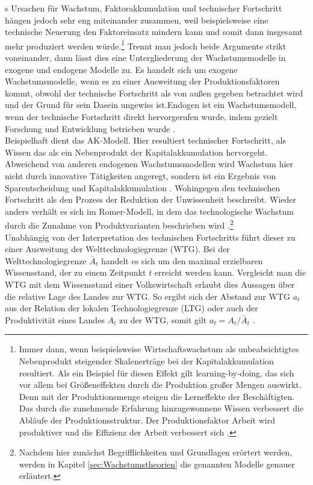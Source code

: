 \citeauthor{Gandolfo.1998}s \citeyear{Gandolfo.1998} Ursachen für Wachstum, Faktorakkumulation und technischer Fortschritt hängen jedoch sehr eng miteinander zusammen, weil beispielsweise eine technische Neuerung den Faktoreinsatz mindern kann und somit dann insgesamt mehr produziert werden w{\"u}rde.\footnote{Immer dann, wenn beispielsweise Wirtschaftswachstum als unbeabsichtigtes Nebenprodukt steigender Skalenertr{\"a}ge bei der Kapitalakkumulation resultiert. Als ein Beispiel f{\"u}r diesen Effekt gilt learning-by-doing, das sich vor allem bei Gr{\"o}{\ss}eneffekten durch die Produktion gro{\ss}er Mengen auswirkt. Denn mit der Produktionsmenge steigen die Lerneffekte der Besch{\"a}ftigten. Das durch die zunehmende Erfahrung hinzugewonnene Wissen verbessert die Abl{\"a}ufe der Produktionsstruktur. Der Produktionsfaktor Arbeit wird produktiver und die Effizienz der Arbeit verbessert sich \citep{Acemoglu.2009}.} Trennt man jedoch beide Argumente strikt voneinander, dann l{\"a}sst dies eine Untergliederung der Wachstumsmodelle in exogene und endogene Modelle zu. Es handelt sich um exogene Wachstumsmodelle, wenn es zu einer Ausweitung der Produktionsfaktoren kommt, obwohl der technische Fortschritt als von au{\ss}en gegeben betrachtet wird und der Grund f{\"u}r sein Dasein ungewiss ist.\newline Endogen ist ein Wachstumsmodell, wenn der technische Fortschritt direkt hervorgerufen wurde, indem gezielt Forschung und Entwicklung betrieben wurde \citep{Gandolfo.1998}.\\


Beispielhaft dient das AK-Modell. Hier resultiert technischer Fortschritt, als Wissen das als ein Nebenprodukt der Kapitalakkumulation hervorgeht. Abweichend von anderen endogenen Wachstumsmodellen wird Wachstum hier nicht durch innovative T{\"a}tigkeiten angeregt, sondern ist ein Ergebnis von Sparentscheidung und Kapitalakkumulation \citep{Rebelo.1991}. Wohingegen \citet{Arrow.1969} den technischen Fortschritt als den Prozess der Reduktion der Unwissenheit beschreibt. Wieder anders verh{\"a}lt es sich im Romer-Modell, in dem das technologische Wachstum durch die Zunahme von Produktvarianten beschrieben wird \citep{Romer.1990}.\footnote{Nachdem hier zunächst Begrifflichkeiten und Grundlagen erörtert werden, werden in Kapitel \ref{sec:Wachstumstheorien} die genannten Modelle genauer erläutert.}\\
Unabhängig von der Interpretation des technischen Fortschritts führt dieser zu einer Ausweitung der Welttechnologiegrenze (WTG). Bei der Welttechnologiegrenze $\bar{A}_t$  handelt es sich um den maximal erzielbaren Wissensstand, der zu einem Zeitpunkt $t$ erreicht werden kann. Vergleicht man die WTG mit dem Wissensstand einer Volkswirtschaft erlaubt dies Aussagen über die relative Lage des Landes zur WTG. So ergibt sich der Abstand zur WTG $a_t$ aus der Relation der lokalen Technologiegrenze (LTG) oder auch der Produktivität eines Landes $A_t$ zu der WTG, somit gilt $a_t = A_t/\bar{A}_t$ \citep{Aghion.1992,Aghion.1998}.\\


